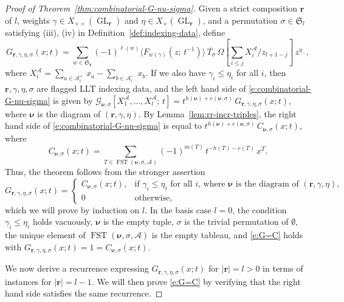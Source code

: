 \documentclass[12pt]{amsart}
\theoremstyle{definition}
\theoremstyle{remark}
\newcommand{\rr}{{\mathbf r}}
\newcommand{\nubold}{{\boldsymbol \nu }}
\newcommand{\Sfrak}{{\mathfrak S}}
\newcommand{\Acal}{{\mathcal A}}
\newcommand{\Gcal}{{\mathcal G}}
\DeclareMathOperator{\GL}{GL}
\DeclareMathOperator{\FSST}{FST}
\begin{document}
\begin{proof}[Proof of Theorem~\ref{thm:combinatorial-G-nu-sigma}]
Given a strict composition $\rr $ of $l$, weights $\gamma \in
X_{++}(\GL _{\rr})$ and $\eta \in X_{+}(\GL _{\rr })$, and a
permutation $\sigma \in \Sfrak _{l}$ satisfying (iii), (iv) in
Definition~\ref{def:indexing-data}, define
\begin{equation}\label{e:G-triples-1}
G_{\rr ,\gamma ,\eta ,\sigma }(x;t)
 = \sum _{w\in \Sfrak _{\rr }} (-1)^{\ell (w)} \langle F_{w(\gamma
)}(z;\, t^{-1}) \rangle\, \overline{T_{\sigma }}\, \Omega [\sum
_{i\leq j} X^\Acal_{i} /z_{l+1-j}] \, z^{\eta _{-}},
\end{equation}
where $X^\Acal_{i} = \sum _{a\in \Acal _{i}^{+}}\, x_{a} - \sum _{b\in \Acal
_{i}^{-}}\, x_{b}$.  If we also have $\gamma _{i}\leq \eta _{i}$ for
all $i$, then $\rr ,\gamma,\eta ,\sigma $ are flagged LLT indexing
data, and the left hand side of \eqref{e:combinatorial-G-nu-sigma} is
given by $\Gcal _{\nubold ,\sigma }[X^\Acal_{1},\ldots, X^\Acal_{l};\, t] =
t^{h(\nubold )+e(\nubold ,\sigma )}\, G_{\rr ,\gamma ,\eta ,\sigma
}(x;t)$, where $\nubold $ is the diagram of $(\rr ,\gamma ,\eta )$.
By Lemma~\ref{lem:rr-incr-triples}, the right hand side of
\eqref{e:combinatorial-G-nu-sigma} is equal to $t^{h(\nubold
)+e(\nubold ,\sigma )}\, C_{\nubold ,\sigma }(x; t)$, where
\begin{equation}\label{e:C-triples}
C_{\nubold ,\sigma }(x; t) = \sum _{T\in \FSST (\nubold ,\sigma
,\Acal )} (-1)^{m(T)}\, t^{-h(T)-e(T)}\, x^{T}.
\end{equation}
Thus, the theorem follows from the stronger assertion
\begin{equation}\label{e:G=C}
G_{\rr ,\gamma ,\eta ,\sigma }(x;t) = \begin{cases} C_{\nubold ,\sigma
}(x; t), & \text{if $\gamma _{i}\leq \eta  _{i}$ for
all $i$, where $\nubold $ is the diagram of $(\rr ,\gamma ,\eta )$,}\\
0&  \text{otherwise},
\end{cases}
\end{equation}
which we will prove by induction on $l$.  In the basis case $l=0$, the
condition $\gamma _{i}\leq \eta _{i}$ holds vacuously, $\nubold $ is
the empty tuple, $\sigma $ is the trivial permutation of $\emptyset $,
the unique element of $\FSST (\nubold ,\sigma ,\Acal )$ is the empty
tableau, and \eqref{e:G=C} holds with $G_{\rr ,\gamma ,\eta ,\sigma
}(x;t) = 1 = C_{\nubold ,\sigma }(x; t)$.

We now derive a recurrence expressing $G_{\rr ,\gamma ,\eta ,\sigma
}(x; t)$ for $|\rr | = l > 0$ in terms of instances for $|\rr | =
l-1$.  We will then prove \eqref{e:G=C} by verifying that the right
hand side satisfies the same recurrence.


\end{proof}
\end{document}
